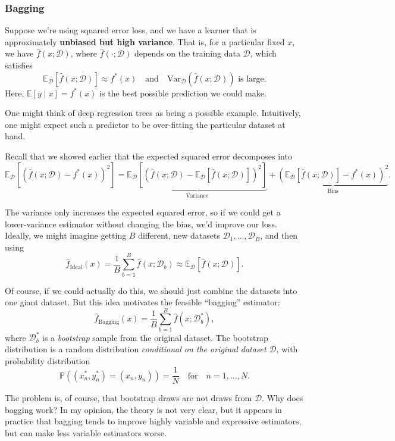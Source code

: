 \subsubsection{Bagging}
Suppose we're using squared error loss, and we have a learner that is
approximately \textbf{unbiased but high variance}. That is, for a particular
fixed $x$, we have $\hat{f}(x; \mathcal{D})$, where $\hat{f}(\cdot; \mathcal{D})$
depends on the training data $\mathcal{D}$, which satisfies
\[
\mathbb{E}_{\mathcal{D}}\left[\hat{f}(x; \mathcal{D})\right] \approx f^*(x)
\quad \text{and} \quad
\mathrm{Var}_{\mathcal{D}}\left(\hat{f}(x; \mathcal{D})\right) \text{ is large.}
\]
Here, $\mathbb{E}\left[y \mid x\right] = f^*(x)$ is the best possible
prediction we could make.

One might think of deep regression trees as being a possible example.
Intuitively, one might expect such a predictor to be over-fitting the
particular dataset at hand.

Recall that we showed earlier that the expected squared error decomposes into
\[
\mathbb{E}_{\mathcal{D}}\left[(\hat{f}(x; \mathcal{D}) - f^*(x))^2\right]
= \underbrace{\mathbb{E}_{\mathcal{D}}\left[\left(\hat{f}(x; \mathcal{D})
- \mathbb{E}_{\mathcal{D}}\left[\hat{f}(x; \mathcal{D})\right]\right)^2\right]}_{\text{Variance}}
+ \underbrace{\left(\mathbb{E}_{\mathcal{D}}\left[\hat{f}(x; \mathcal{D})\right]
- f^*(x)\right)^2}_{\text{Bias}}.
\]

The variance only increases the expected squared error, so if we could
get a lower-variance estimator without changing the bias, we'd improve
our loss. Ideally, we might imagine getting $B$ different, new datasets
$\mathcal{D}_1, \ldots, \mathcal{D}_B$, and then using
\[
\hat{f}_{\text{Ideal}}(x) = \frac{1}{B} \sum_{b=1}^{B} \hat{f}(x; \mathcal{D}_b)
\approx \mathbb{E}_{\mathcal{D}}\left[\hat{f}(x; \mathcal{D})\right].
\]

Of course, if we could actually do this, we should just combine the
datasets into one giant dataset. But this idea motivates the feasible
``bagging'' estimator:
\[
\hat{f}_{\text{Bagging}}(x) = \frac{1}{B} \sum_{b=1}^{B} \hat{f}(x; \mathcal{D}_b^*),
\]
where $\mathcal{D}_b^*$ is a \emph{bootstrap} sample from the original
dataset. The bootstrap distribution is a random distribution
\emph{conditional on the original dataset} $\mathcal{D}$, with probability
distribution
\[
\mathbb{P}\left((x_n^*, y_n^*) = (x_n, y_n)\right) = \frac{1}{N}
\quad \text{for} \quad n = 1, \ldots, N.
\]

The problem is, of course, that bootstrap draws are not draws from
$\mathcal{D}$. Why does bagging work? In my opinion, the theory is not
very clear, but it appears in practice that bagging tends to improve
highly variable and expressive estimators, but can make less variable
estimators worse.


